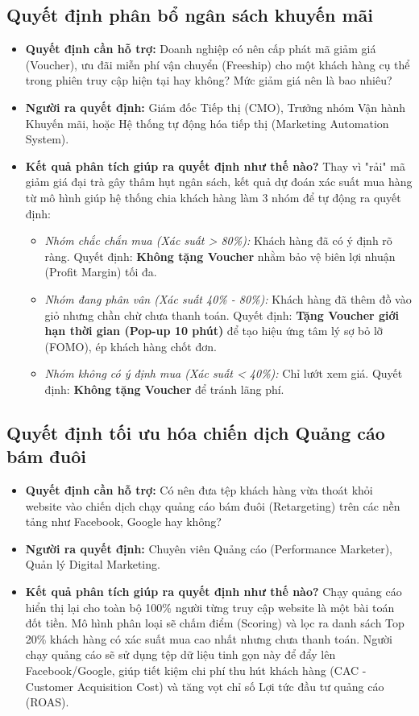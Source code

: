 \documentclass[a4paper,11pt]{article}
\begin{document}
\subsection{Quyết định phân bổ ngân sách khuyến mãi}
\begin{itemize}[itemsep=4pt, leftmargin=*]
    \item \textbf{Quyết định cần hỗ trợ:} Doanh nghiệp có nên cấp phát mã giảm giá (Voucher), ưu đãi miễn phí vận chuyển (Freeship) cho một khách hàng cụ thể trong phiên truy cập hiện tại hay không? Mức giảm giá nên là bao nhiêu?
    \item \textbf{Người ra quyết định:} Giám đốc Tiếp thị (CMO), Trưởng nhóm Vận hành Khuyến mãi, hoặc Hệ thống tự động hóa tiếp thị (Marketing Automation System).
    \item \textbf{Kết quả phân tích giúp ra quyết định như thế nào?} Thay vì "rải" mã giảm giá đại trà gây thâm hụt ngân sách, kết quả dự đoán xác suất mua hàng từ mô hình giúp hệ thống chia khách hàng làm 3 nhóm để tự động ra quyết định:
    \begin{itemize}
        \item \textit{Nhóm chắc chắn mua (Xác suất > 80\%):} Khách hàng đã có ý định rõ ràng. Quyết định: \textbf{Không tặng Voucher} nhằm bảo vệ biên lợi nhuận (Profit Margin) tối đa.
        \item \textit{Nhóm đang phân vân (Xác suất 40\% - 80\%):} Khách hàng đã thêm đồ vào giỏ nhưng chần chừ chưa thanh toán. Quyết định: \textbf{Tặng Voucher giới hạn thời gian (Pop-up 10 phút)} để tạo hiệu ứng tâm lý sợ bỏ lỡ (FOMO), ép khách hàng chốt đơn.
        \item \textit{Nhóm không có ý định mua (Xác suất < 40\%):} Chỉ lướt xem giá. Quyết định: \textbf{Không tặng Voucher} để tránh lãng phí.
    \end{itemize}
\end{itemize}

\subsection{Quyết định tối ưu hóa chiến dịch Quảng cáo bám đuôi }
\begin{itemize}[itemsep=4pt, leftmargin=*]
    \item \textbf{Quyết định cần hỗ trợ:} Có nên đưa tệp khách hàng vừa thoát khỏi website vào chiến dịch chạy quảng cáo bám đuôi (Retargeting) trên các nền tảng như Facebook, Google hay không?
    \item \textbf{Người ra quyết định:} Chuyên viên Quảng cáo (Performance Marketer), Quản lý Digital Marketing.
    \item \textbf{Kết quả phân tích giúp ra quyết định như thế nào?} Chạy quảng cáo hiển thị lại cho toàn bộ 100\% người từng truy cập website là một bài toán đốt tiền. Mô hình phân loại sẽ chấm điểm (Scoring) và lọc ra danh sách Top 20\% khách hàng có xác suất mua cao nhất nhưng chưa thanh toán. Người chạy quảng cáo sẽ sử dụng tệp dữ liệu tinh gọn này để đẩy lên Facebook/Google, giúp tiết kiệm chi phí thu hút khách hàng (CAC - Customer Acquisition Cost) và tăng vọt chỉ số Lợi tức đầu tư quảng cáo (ROAS).
\end{itemize}
\end{document}
